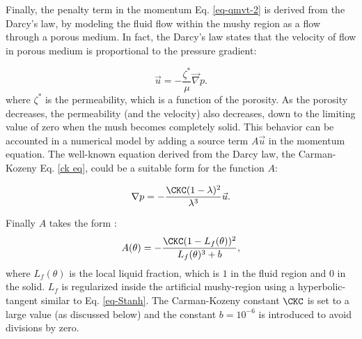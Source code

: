 Finally, the penalty term in the momentum Eq. \ref{eq-qmvt-2} is derived from the Darcy's law, by modeling the fluid flow within the mushy region as a flow through a porous medium.
In fact, the Darcy's law states that the velocity of flow in porous medium is proportional to the pressure gradient:

\begin{equation}
	\vec u = - \frac{\zeta^*}{\mu} \vec \nabla p.
\end{equation}
where $\zeta^*$ is the permeability, which is a function of the porosity.
As the porosity decreases, the permeability (and the velocity) also decreases, down to the limiting value of zero when the mush becomes completely solid.
This behavior can be accounted in a numerical model by adding a source term $A \vec u$ in the momentum equation.
The well-known equation derived from the Darcy law, the Carman-Kozeny Eq. \ref{ck eq}, could be a suitable form for the function $A$:

\begin{equation} \label{ck eq}
	\nabla p = - \frac{\CKC (1 - \lambda)^2}{\lambda^3} \vec u.
\end{equation}

\noindent Finally $A$ takes the form \citep{Belhamadia2012,kheirabadi2015effect}:
\begin{equation}\label{eq-CK}
A(\theta) = -\frac{\CKC (1 - L_f(\theta))^2}{L_f(\theta)^3 + b}, 
\end{equation}
where $L_f(\theta)$ is the local liquid fraction, which is  $1$ in the fluid region and  $0$ in the solid. $L_f$ is regularized inside the artificial  mushy-region using a hyperbolic-tangent similar to Eq. \ref{eq-Stanh}.
The Carman-Kozeny constant $\CKC$ is set to a  large value (as discussed below) and  the constant $b=10^{-6}$ is introduced to avoid divisions by zero.


